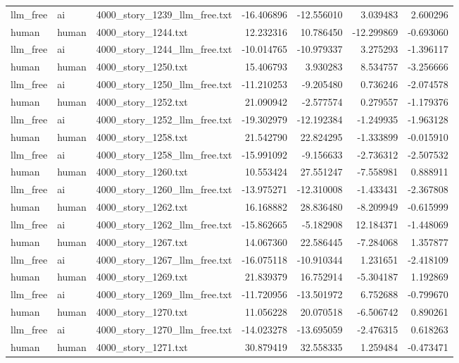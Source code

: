 \begin{longtable}{lllrrrr}
llm\_free & ai & 4000\_story\_1239\_llm\_free.txt & -16.406896 & -12.556010 & 3.039483 & 2.600296 \\
human & human & 4000\_story\_1244.txt & 12.232316 & 10.786450 & -12.299869 & -0.693060 \\
llm\_free & ai & 4000\_story\_1244\_llm\_free.txt & -10.014765 & -10.979337 & 3.275293 & -1.396117 \\
human & human & 4000\_story\_1250.txt & 15.406793 & 3.930283 & 8.534757 & -3.256666 \\
llm\_free & ai & 4000\_story\_1250\_llm\_free.txt & -11.210253 & -9.205480 & 0.736246 & -2.074578 \\
human & human & 4000\_story\_1252.txt & 21.090942 & -2.577574 & 0.279557 & -1.179376 \\
llm\_free & ai & 4000\_story\_1252\_llm\_free.txt & -19.302979 & -12.192384 & -1.249935 & -1.963128 \\
human & human & 4000\_story\_1258.txt & 21.542790 & 22.824295 & -1.333899 & -0.015910 \\
llm\_free & ai & 4000\_story\_1258\_llm\_free.txt & -15.991092 & -9.156633 & -2.736312 & -2.507532 \\
human & human & 4000\_story\_1260.txt & 10.553424 & 27.551247 & -7.558981 & 0.888911 \\
llm\_free & ai & 4000\_story\_1260\_llm\_free.txt & -13.975271 & -12.310008 & -1.433431 & -2.367808 \\
human & human & 4000\_story\_1262.txt & 16.168882 & 28.836480 & -8.209949 & -0.615999 \\
llm\_free & ai & 4000\_story\_1262\_llm\_free.txt & -15.862665 & -5.182908 & 12.184371 & -1.448069 \\
human & human & 4000\_story\_1267.txt & 14.067360 & 22.586445 & -7.284068 & 1.357877 \\
llm\_free & ai & 4000\_story\_1267\_llm\_free.txt & -16.075118 & -10.910344 & 1.231651 & -2.418109 \\
human & human & 4000\_story\_1269.txt & 21.839379 & 16.752914 & -5.304187 & 1.192869 \\
llm\_free & ai & 4000\_story\_1269\_llm\_free.txt & -11.720956 & -13.501972 & 6.752688 & -0.799670 \\
human & human & 4000\_story\_1270.txt & 11.056228 & 20.070518 & -6.506742 & 0.890261 \\
llm\_free & ai & 4000\_story\_1270\_llm\_free.txt & -14.023278 & -13.695059 & -2.476315 & 0.618263 \\
human & human & 4000\_story\_1271.txt & 30.879419 & 32.558335 & 1.259484 & -0.473471 \\

\end{longtable}
